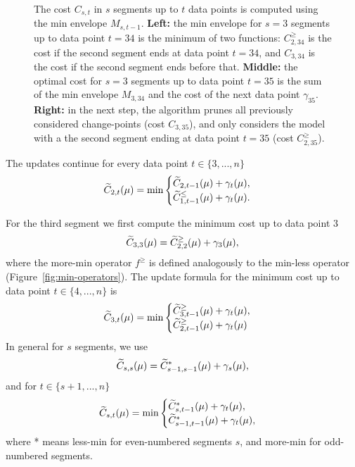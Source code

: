\documentclass{article}
\begin{document}
\begin{figure}[!t]
  \begin{center}
    
  \end{center}
  \caption{\label{fig:min-envelope} The cost $C_{s,t}$ in $s$ segments
    up to $t$ data points is computed using the min envelope
    $M_{s,t-1}$. \textbf{Left:} the min envelope for $s=3$ segments up
    to data point $t=34$ is the minimum of two functions:
    $C^{\geq}_{2,34}$ is the cost if the second segment ends at data
    point $t=34$, and $C_{3,34}$ is the cost if the second segment
    ends before that. \textbf{Middle:} the optimal cost for $s=3$
    segments up to data point $t=35$ is the sum of the min envelope
    $M_{3,34}$ and the cost of the next data point
    $\gamma_{35}$. \textbf{Right:} in the next step, the
    algorithm prunes all previously considered change-points (cost
    $C_{3,35}$), and only considers the model with a the second segment
    ending at data point $t=35$ (cost $C^{\geq}_{2,35}$).}
\end{figure}

The updates continue for every data point $t\in\{3, ..., n\}$
\begin{equation*}
  \widetilde{C}_{2,t}(\mu) = \min
  \begin{cases}
    \widetilde{C}_{2,t-1}(\mu) + \gamma_t(\mu),\\
    \widetilde{C}_{1,t-1}^{\leq}(\mu) + \gamma_t(\mu).
  \end{cases}
\end{equation*}

For the third segment we first compute the minimum cost up to data point 3
\begin{equation*}
  \widetilde{C}_{3,3}(\mu) = \widetilde{C}_{2,2}^{\geq}(\mu) + \gamma_3(\mu),
\end{equation*}
where the more-min operator $f^\geq$ is defined analogously to the
min-less operator (Figure~\ref{fig:min-operators}). The update formula
for the minimum cost up to data point $t\in\{4, ..., n\}$ is
\begin{equation*}
  \widetilde{C}_{3,t}(\mu) = \min
  \begin{cases}
    \widetilde{C}_{3,t-1}^{\geq}(\mu)+\gamma_t(\mu),\\
    \widetilde{C}_{2,t-1}^{\geq}(\mu)+\gamma_t(\mu)
  \end{cases}
\end{equation*}
In general for $s$ segments, we use
\begin{equation}
  \widetilde{C}_{s,s}(\mu) = \widetilde{C}_{s-1,s-1}^{*}(\mu) + \gamma_s(\mu),
\end{equation}
and for $t\in\{s+1, ..., n\}$
\begin{equation}
  \widetilde{C}_{s,t}(\mu) = \min
  \begin{cases}
    \widetilde{C}_{s,t-1}^{*}(\mu)+\gamma_t(\mu),\\
    \widetilde{C}_{s-1,t-1}^{*}(\mu)+\gamma_t(\mu),
  \end{cases}
\end{equation}
where * means less-min for even-numbered segments $s$, and more-min
for odd-numbered segments.
\end{document}
